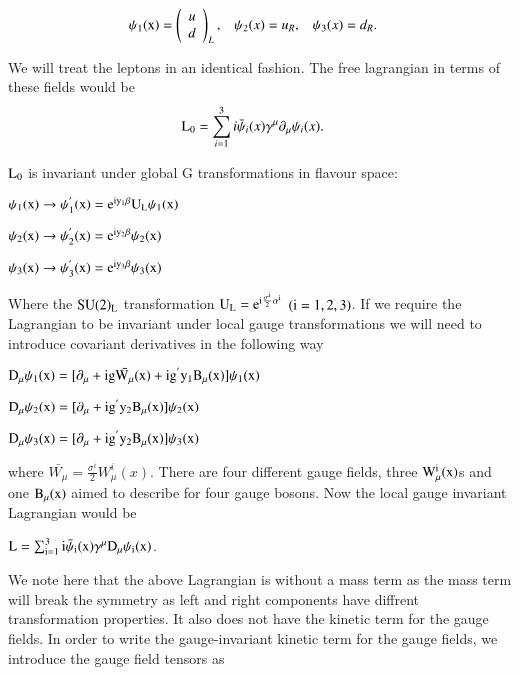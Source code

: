 \begin{align} \label{LRstates}
\rm \psi_{1}(x) &= \left( \begin{array}{cc} u  \\ d  \end{array} \right)_{L},  & \psi_{2}(x) &= u_{R},   & \psi_{3}(x) &= d_{R}.
\end{align}

We will treat the leptons in an identical fashion. The free lagrangian in terms of these fields would be 
\begin{align} \label{L0}
\rm L_{0} &= \sum_{i=1}^{3} i\bar{\psi}_{i}(x)\gamma^{\mu}\partial_{\mu}\psi_{i}(x).
\end{align}



 $\rm L_{0}$ is invariant under global G transformations in flavour space:

$\rm \psi_{1}(x) \rightarrow \psi_{1}^{'}(x) = e^{iy_{1}\beta} U_{L} \psi_{1}(x)$ 

$\rm \psi_{2}(x) \rightarrow \psi_{2}^{'}(x) = e^{iy_{2}\beta} \psi_{2}(x)$

$\rm \psi_{3}(x) \rightarrow \psi_{3}^{'}(x) = e^{iy_{3}\beta}  \psi_{3}(x)$

Where the $\rm SU(2)_{L}$ transformation $\rm U_{L} = e^{i\frac{\sigma^{i}}{2}\alpha^{i}}$ $\rm (i = 1, 2, 3)$. If we require the Lagrangian to be invariant under local gauge transformations we will need to introduce covariant derivatives in the following way

$\rm D_{\mu} \psi_{1}(x) = [\partial_{\mu} + ig\bar{W_{\mu}}(x) + ig^{'}y_{1}B_{\mu}(x)] \psi_{1}(x)$

$\rm D_{\mu} \psi_{2}(x) = [\partial_{\mu} + ig^{'}y_{2}B_{\mu}(x)] \psi_{2}(x)$

$\rm D_{\mu} \psi_{3}(x) = [\partial_{\mu} +  ig^{'}y_{2}B_{\mu}(x)] \psi_{3}(x)$

where $\bar{W_{\mu}} = \frac{\sigma^{i}}{2} W^{i}_{\mu}(x)$. There are four different gauge fields, three $\rm W^{i}_{\mu}(x)$s and one $\rm B_{\mu}(x)$ aimed to describe for four gauge bosons. Now the local gauge invariant Lagrangian would be

$\rm L= \sum_{i=1}^{3} i\bar{\psi}_{i}(x)\gamma^{\mu} D_{\mu} \psi_{i}(x)$. 

We note here that the above Lagrangian is without a mass term as the mass term will break the symmetry as left and right components  have diffrent transformation properties. It also does not have the kinetic term for the gauge fields. In order to write the gauge-invariant kinetic term for the gauge fields, we introduce the gauge field tensors as 

